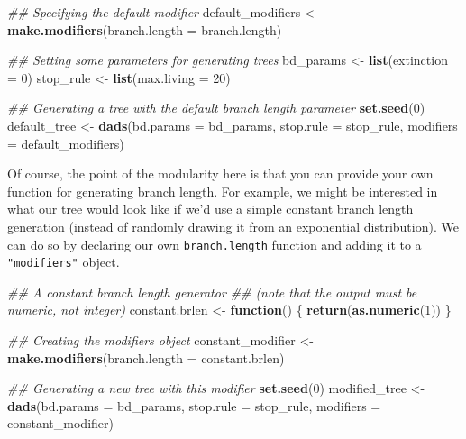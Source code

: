 \documentclass[]{book}
\newenvironment{Shaded}{\begin{snugshade}}{\end{snugshade}}
\newcommand{\CommentTok}[1]{\textcolor[rgb]{0.56,0.35,0.01}{\textit{#1}}}
\newcommand{\ControlFlowTok}[1]{\textcolor[rgb]{0.13,0.29,0.53}{\textbf{#1}}}
\newcommand{\DataTypeTok}[1]{\textcolor[rgb]{0.13,0.29,0.53}{#1}}
\newcommand{\DecValTok}[1]{\textcolor[rgb]{0.00,0.00,0.81}{#1}}
\newcommand{\KeywordTok}[1]{\textcolor[rgb]{0.13,0.29,0.53}{\textbf{#1}}}
\newcommand{\NormalTok}[1]{#1}
\newcommand{\StringTok}[1]{\textcolor[rgb]{0.31,0.60,0.02}{#1}}
\begin{document}
\begin{Shaded}
\begin{Highlighting}[]
\CommentTok{## Specifying the default modifier}
\NormalTok{default_modifiers <-}\StringTok{ }\KeywordTok{make.modifiers}\NormalTok{(}\DataTypeTok{branch.length =}\NormalTok{ branch.length)}

\CommentTok{## Setting some parameters for generating trees}
\NormalTok{bd_params <-}\StringTok{ }\KeywordTok{list}\NormalTok{(}\DataTypeTok{extinction =} \DecValTok{0}\NormalTok{)}
\NormalTok{stop_rule <-}\StringTok{ }\KeywordTok{list}\NormalTok{(}\DataTypeTok{max.living =} \DecValTok{20}\NormalTok{)}

\CommentTok{## Generating a tree with the default branch length parameter}
\KeywordTok{set.seed}\NormalTok{(}\DecValTok{0}\NormalTok{)}
\NormalTok{default_tree <-}\StringTok{ }\KeywordTok{dads}\NormalTok{(}\DataTypeTok{bd.params =}\NormalTok{ bd_params,}
                     \DataTypeTok{stop.rule =}\NormalTok{ stop_rule,}
                     \DataTypeTok{modifiers =}\NormalTok{ default_modifiers)}
\end{Highlighting}
\end{Shaded}

Of course, the point of the modularity here is that you can provide your own function for generating branch length.
For example, we might be interested in what our tree would look like if we'd use a simple constant branch length generation (instead of randomly drawing it from an exponential distribution).
We can do so by declaring our own \texttt{branch.length} function and adding it to a \texttt{"modifiers"} object.

\begin{Shaded}
\begin{Highlighting}[]
\CommentTok{## A constant branch length generator}
\CommentTok{## (note that the output must be numeric, not integer)}
\NormalTok{constant.brlen <-}\StringTok{ }\ControlFlowTok{function}\NormalTok{() \{}
    \KeywordTok{return}\NormalTok{(}\KeywordTok{as.numeric}\NormalTok{(}\DecValTok{1}\NormalTok{))}
\NormalTok{\}}

\CommentTok{## Creating the modifiers object}
\NormalTok{constant_modifier <-}\StringTok{ }\KeywordTok{make.modifiers}\NormalTok{(}\DataTypeTok{branch.length =}\NormalTok{ constant.brlen)}

\CommentTok{## Generating a new tree with this modifier}
\KeywordTok{set.seed}\NormalTok{(}\DecValTok{0}\NormalTok{)}
\NormalTok{modified_tree <-}\StringTok{ }\KeywordTok{dads}\NormalTok{(}\DataTypeTok{bd.params =}\NormalTok{ bd_params,}
                      \DataTypeTok{stop.rule =}\NormalTok{ stop_rule,}
                      \DataTypeTok{modifiers =}\NormalTok{ constant_modifier)}
\end{Highlighting}
\end{Shaded}
\end{document}
